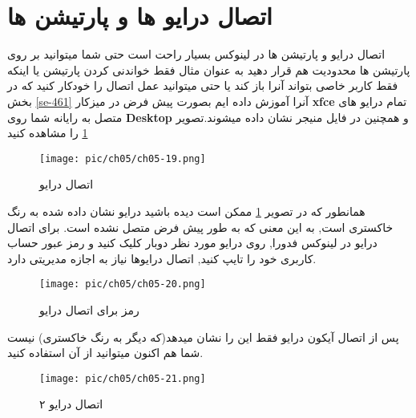 \section{اتصال درایو ها و پارتیشن ها}\label{se-46}
اتصال درایو و پارتیشن ها در لینوکس بسیار راحت است حتی شما میتوانید بر روی پارتیشن ها محدودیت هم قرار دهید به عنوان مثال فقط خواندنی کردن پارتیشن یا اینکه فقط کاربر خاصی بتواند آنرا باز کند یا حتی میتوانید عمل اتصال
\textbf{}
را خودکار کنید که در بخش
\ref{se-461}
آنرا آموزش داده ایم
بصورت پیش فرض در میزکار 
\textbf{xfce}
تمام درایو های متصل به رایانه شما روی
\textbf{Desktop}
و همچنین در فایل منیجر نشان داده میشوند.تصویر
\ref{pic-55}
را مشاهده کنید
	\begin{figure}[H]%
	\caption{اتصال درایو}
	\begin{center}
		\texttt{[image: pic/ch05/ch05-19.png]}
	\end{center}
	\label{pic-55}
\end{figure}
همانطور که در تصویر
\ref{pic-55}
ممکن است دیده باشید درایو نشان داده شده به رنگ خاکستری است, به این معنی که به طور پیش فرض متصل نشده است. برای اتصال درایو در لینوکس فدورا, روی درایو مورد نظر دوبار کلیک کنید و رمز عبور حساب کاربری خود را تایپ کنید, اتصال درایوها نیاز به اجازه مدیریتی دارد.
	\begin{figure}[H]%
	\caption{رمز برای اتصال درایو}
	\begin{center}
		\texttt{[image: pic/ch05/ch05-20.png]}
	\end{center}
	\label{pic-56}
\end{figure}
پس از اتصال آیکون درایو فقط این را نشان میدهد(که دیگر به رنگ خاکستری) نیست شما هم اکنون میتوانید از آن استفاده کنید.
	\begin{figure}[H]%
	\caption{اتصال درایو ۲}
	\begin{center}
		\texttt{[image: pic/ch05/ch05-21.png]}
	\end{center}
	\label{pic-57}
\end{figure}
